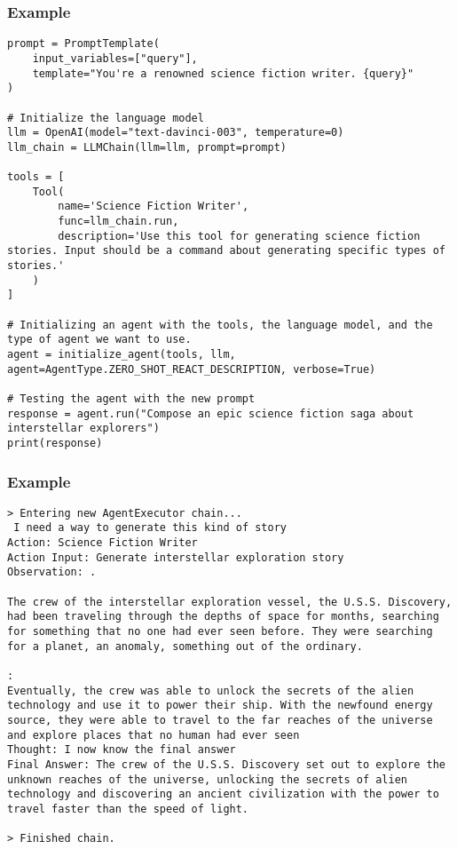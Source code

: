 \begin{frame}[fragile]
\frametitle{Example}

\begin{lstlisting}
prompt = PromptTemplate(
    input_variables=["query"],
    template="You're a renowned science fiction writer. {query}"
)

# Initialize the language model
llm = OpenAI(model="text-davinci-003", temperature=0)
llm_chain = LLMChain(llm=llm, prompt=prompt)

tools = [
    Tool(
        name='Science Fiction Writer',
        func=llm_chain.run,
        description='Use this tool for generating science fiction stories. Input should be a command about generating specific types of stories.'
    )
]

# Initializing an agent with the tools, the language model, and the type of agent we want to use.
agent = initialize_agent(tools, llm, agent=AgentType.ZERO_SHOT_REACT_DESCRIPTION, verbose=True)

# Testing the agent with the new prompt
response = agent.run("Compose an epic science fiction saga about interstellar explorers")
print(response)
\end{lstlisting}

\end{frame}

\begin{frame}[fragile]
\frametitle{Example}

\begin{lstlisting}
> Entering new AgentExecutor chain...
 I need a way to generate this kind of story
Action: Science Fiction Writer
Action Input: Generate interstellar exploration story
Observation: .

The crew of the interstellar exploration vessel, the U.S.S. Discovery, had been traveling through the depths of space for months, searching for something that no one had ever seen before. They were searching for a planet, an anomaly, something out of the ordinary.

:
Eventually, the crew was able to unlock the secrets of the alien technology and use it to power their ship. With the newfound energy source, they were able to travel to the far reaches of the universe and explore places that no human had ever seen
Thought: I now know the final answer
Final Answer: The crew of the U.S.S. Discovery set out to explore the unknown reaches of the universe, unlocking the secrets of alien technology and discovering an ancient civilization with the power to travel faster than the speed of light.

> Finished chain.
\end{lstlisting}

\end{frame}

